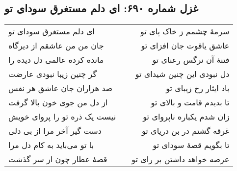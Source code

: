 \begin{center}
\section*{غزل شماره ۶۹۰: ای دلم مستغرق سودای تو}
\label{sec:690}
\begin{longtable}{l p{0.5cm} r}
ای دلم مستغرق سودای تو
&&
سرمهٔ چشمم ز خاک پای تو
\\
جان من من عاشقم از دیرگاه
&&
عاشق یاقوت جان افزای تو
\\
مانده کرده عالمی دل دیده را
&&
فتنهٔ آن نرگس رعنای تو
\\
گر چنین زیبا نبودی عارضت
&&
دل نبودی این چنین شیدای تو
\\
صد هزاران جان عاشق هر نفس
&&
باد ایثار رخ زیبای تو
\\
از دل من جوی خون بالا گرفت
&&
تا بدیدم قامت و بالای تو
\\
نیست یک ذره تو را پروای خویش
&&
زان شدم یکباره ناپروای تو
\\
دست گیر آخر مرا از بی دلی
&&
غرقه گشتم در بن دریای تو
\\
با تو می‌باید به کام دل مرا
&&
تا بگویم قصهٔ سودای تو
\\
قصهٔ عطار چون از سر گذشت
&&
عرضه خواهد داشتن بر رای تو
\\
\end{longtable}
\end{center}
